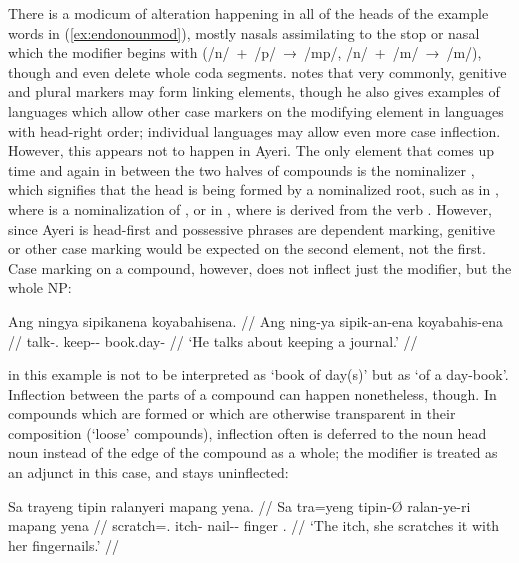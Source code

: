 There is a modicum of alteration happening in all of the heads of the example 
words in (\ref{ex:endonounmod}), mostly nasals assimilating to the stop or 
nasal which the modifier begins with (/n/~+~/p/~→~/mp/, /n/~+~/m/~→~/m/), 
though  and  even delete 
whole coda segments.
\citet[703]{bauer2001} notes that very commonly, genitive and plural markers 
may form linking elements, though he also gives examples of languages which
allow other case markers on the modifying element in languages with head-right
order; individual languages may allow even more case inflection. However, this
appears not to happen in Ayeri. The only element that comes up time and again
in between the two halves of compounds is the nominalizer ,
which signifies that the head is being formed by a nominalized root, such as in
, where  is a 
nominalization of , or in 
, where  is derived 
from the verb . However, since Ayeri is head-first and
possessive phrases are dependent marking, genitive or other case marking would
be expected on the second element, not the first. Case marking on a compound,
however, does not inflect just the modifier, but the whole NP:

\ex\begingl
	\gla Ang ningya sipikanena koyabahisena. //
	\glb Ang ning-ya sipik-an-ena koyabahis-ena //
	\glc \AgtT{} talk-\TsgM{}.\Top{} keep-\Nmlz{}-\Gen{} book.day-\Gen{} //
	\glft `He talks about keeping a journal.' //
\endgl\xe

 in this example is not to be interpreted as 
`book of day(s)' but as `of a day-book'. Inflection between the parts of a
compound can happen nonetheless, though. In compounds which are formed  or which are otherwise transparent in their composition (`loose'
compounds\label{loosecomp}), inflection often is deferred to the noun head noun
instead of the edge of the compound as a whole; the modifier is treated as an
adjunct in this case, and stays uninflected:

\ex\label{ex:nouncompdiv}\begingl
	\gla Sa trayeng tipin ralanyeri mapang yena. //
	\glb Sa tra=yeng tipin-Ø ralan-ye-ri mapang yena //
	\glc \PatT{} scratch=\TsgF{}.\Aarg{} itch-\Top{} nail-\Pl{}-\Ins{} 
		finger \TsgF{}.\Gen{} //
	\glft `The itch, she scratches it with her fingernails.' //
\endgl\xe

